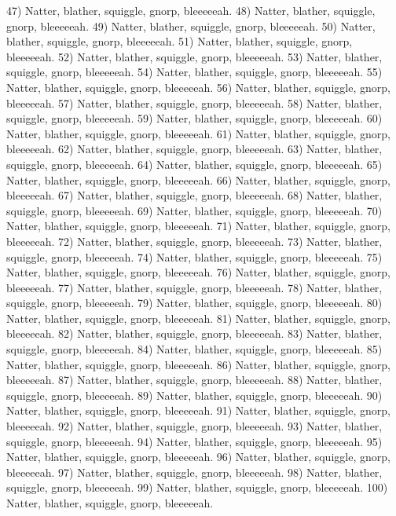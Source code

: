 \documentclass[10pt,letterpaper,busletter,dateno,addrfromright,addrfromleft,orderfromtodate,%
faxheaderpage]{newlfm}
\begin{document}
\begin{newlfm}
47) Natter, blather, squiggle, gnorp, bleeeeeah.
48) Natter, blather, squiggle, gnorp, bleeeeeah.
49) Natter, blather, squiggle, gnorp, bleeeeeah.
50) Natter, blather, squiggle, gnorp, bleeeeeah.
51) Natter, blather, squiggle, gnorp, bleeeeeah.
52) Natter, blather, squiggle, gnorp, bleeeeeah.
53) Natter, blather, squiggle, gnorp, bleeeeeah.
54) Natter, blather, squiggle, gnorp, bleeeeeah.
55) Natter, blather, squiggle, gnorp, bleeeeeah.
56) Natter, blather, squiggle, gnorp, bleeeeeah.
57) Natter, blather, squiggle, gnorp, bleeeeeah.
58) Natter, blather, squiggle, gnorp, bleeeeeah.
59) Natter, blather, squiggle, gnorp, bleeeeeah.
60) Natter, blather, squiggle, gnorp, bleeeeeah.
61) Natter, blather, squiggle, gnorp, bleeeeeah.
62) Natter, blather, squiggle, gnorp, bleeeeeah.
63) Natter, blather, squiggle, gnorp, bleeeeeah.
64) Natter, blather, squiggle, gnorp, bleeeeeah.
65) Natter, blather, squiggle, gnorp, bleeeeeah.
66) Natter, blather, squiggle, gnorp, bleeeeeah.
67) Natter, blather, squiggle, gnorp, bleeeeeah.
68) Natter, blather, squiggle, gnorp, bleeeeeah.
69) Natter, blather, squiggle, gnorp, bleeeeeah.
70) Natter, blather, squiggle, gnorp, bleeeeeah.
71) Natter, blather, squiggle, gnorp, bleeeeeah.
72) Natter, blather, squiggle, gnorp, bleeeeeah.
73) Natter, blather, squiggle, gnorp, bleeeeeah.
74) Natter, blather, squiggle, gnorp, bleeeeeah.
75) Natter, blather, squiggle, gnorp, bleeeeeah.
76) Natter, blather, squiggle, gnorp, bleeeeeah.
77) Natter, blather, squiggle, gnorp, bleeeeeah.
78) Natter, blather, squiggle, gnorp, bleeeeeah.
79) Natter, blather, squiggle, gnorp, bleeeeeah.
80) Natter, blather, squiggle, gnorp, bleeeeeah.
81) Natter, blather, squiggle, gnorp, bleeeeeah.
82) Natter, blather, squiggle, gnorp, bleeeeeah.
83) Natter, blather, squiggle, gnorp, bleeeeeah.
84) Natter, blather, squiggle, gnorp, bleeeeeah.
85) Natter, blather, squiggle, gnorp, bleeeeeah.
86) Natter, blather, squiggle, gnorp, bleeeeeah.
87) Natter, blather, squiggle, gnorp, bleeeeeah.
88) Natter, blather, squiggle, gnorp, bleeeeeah.
89) Natter, blather, squiggle, gnorp, bleeeeeah.
90) Natter, blather, squiggle, gnorp, bleeeeeah.
91) Natter, blather, squiggle, gnorp, bleeeeeah.
92) Natter, blather, squiggle, gnorp, bleeeeeah.
93) Natter, blather, squiggle, gnorp, bleeeeeah.
94) Natter, blather, squiggle, gnorp, bleeeeeah.
95) Natter, blather, squiggle, gnorp, bleeeeeah.
96) Natter, blather, squiggle, gnorp, bleeeeeah.
97) Natter, blather, squiggle, gnorp, bleeeeeah.
98) Natter, blather, squiggle, gnorp, bleeeeeah.
99) Natter, blather, squiggle, gnorp, bleeeeeah.
100) Natter, blather, squiggle, gnorp, bleeeeeah.

\end{newlfm}
\end{document}

